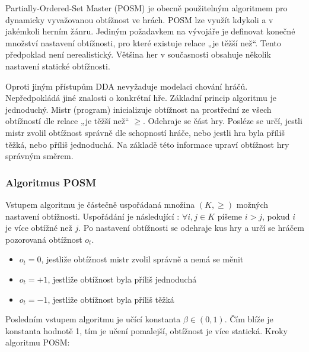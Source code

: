 Partially-Ordered-Set Master (POSM) \cite{22posm1} je obecně použitelným algoritmem pro dynamicky vyvažovanou obtížnost ve hrách. POSM lze využít kdykoli a v jakémkoli herním žánru. Jediným požadavkem na vývojáře je definovat konečné množství nastavení obtížnosti, pro které existuje relace „je těžší než“. Tento předpoklad není nerealistický. Většina her v současnosti obsahuje několik nastavení statické obtížnosti.

Oproti jiným přístupům DDA nevyžaduje modelaci chování hráčů. Nepředpokládá jiné znalosti o konkrétní hře. 
Základní princip algoritmu je jednoduchý. Mistr (program) inicializuje obtížnost na prostřední ze všech obtížností dle relace „je těžší než“ $\geq$. Odehraje se část hry. Posléze se určí, jestli mistr zvolil obtížnost správně dle schopností hráče, nebo jestli hra byla příliš těžká, nebo příliš jednoduchá. Na základě této informace upraví obtížnost hry správným směrem.

\subsubsection{Algoritmus POSM}

Vstupem algoritmu je částečně uspořádaná množina $(K,\geq)$ možných nastavení obtížnosti. Uspořádání je následující : $\forall i,j \in K$ píšeme $i>j$, pokud $i$ je více obtížné než $j$.
Po nastavení obtížnosti se odehraje kus hry a určí se hráčem pozorovaná obtížnost $o_t$.

\begin{itemize}
	\item $o_t=0$, jestliže obtížnost mistr zvolil správně a nemá se měnit
	\item $o_t=+1$, jestliže obtížnost byla příliš jednoduchá
	\item $o_t=-1$, jestliže obtížnost byla příliš těžká
\end{itemize}
	
Posledním vstupem algoritmu je učící konstanta $\beta\in(0,1)$. Čím blíže je konstanta hodnotě 1, tím je učení pomalejší, obtížnost je více statická.
Kroky algoritmu POSM:

